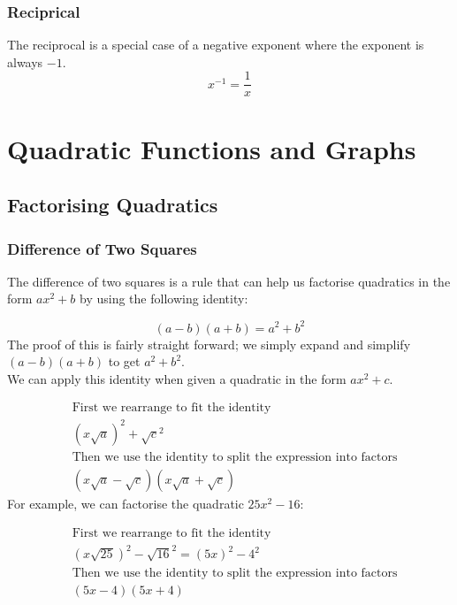 \documentclass{article}
\begin{document}
\subsubsection{Reciprical}
The reciprocal is a special case of a negative exponent where the exponent is always $-1$.
\begin{equation}
	\label{simple_equation}
	x^{-1} = \frac{1}{x}
\end{equation}

\break
\section{Quadratic Functions and Graphs}

\subsection{Factorising Quadratics}

\subsubsection{Difference of Two Squares}
The difference of two squares is a rule that can help us
factorise quadratics in the form $ax^2 + b$ by using the
following identity:

\begin{equation}
	(a - b)(a + b) = a^2 + b^2
\end{equation}
The proof of this is fairly straight forward; we simply expand and simplify $(a - b)(a + b)$ to get $a^2 + b^2$.
\\
We can apply this identity when given a quadratic in the form $ax^2 + c$.

\begin{align*}
	&\text{First we rearrange to fit the identity}\\
	&(x\sqrt{a})^2 + \sqrt{c}^2\\
	&\text{Then we use the identity to split the expression into factors}\\
	&(x\sqrt{a} - \sqrt{c})(x\sqrt{a} + \sqrt{c})
\end{align*}
For example, we can factorise the quadratic $25x^2 - 16$:

\begin{align*}
	&\text{First we rearrange to fit the identity}\\
	&(x\sqrt{25})^2 - \sqrt{16}^2 = (5x)^2 - 4^2\\
	&\text{Then we use the identity to split the expression into factors}\\
	&(5x - 4)(5x + 4)
\end{align*}
\end{document}
